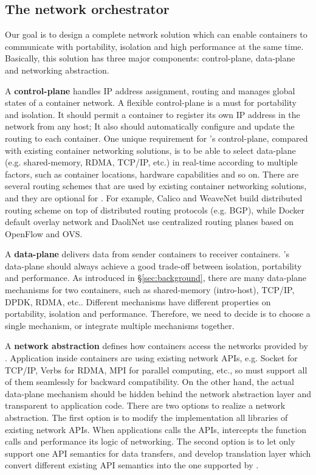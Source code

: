 \subsection{The network orchestrator}

\iffalse

Our goal is to design a complete network solution which can enable containers
to communicate with portability, isolation and high performance at the same time.
Basically, this solution has three major components: control-plane, data-plane 
and networking abstraction. 


A \textbf{control-plane} handles IP address assignment, routing and manages global states of a container network.
A flexible control-plane is a must for portability and isolation. 
It should permit a container to register its own IP address in the network
from any host; It also should automatically configure and update the routing 
to each container. One unique requirement for \sysname's control-plane,
compared with existing container networking solutions, is to be able to 
select data-plane (e.g. shared-memory, RDMA, TCP/IP, etc.) in real-time
according to multiple factors, such as container locations, hardware 
capabilities and so on. 
There are several routing schemes that are used by existing
container networking solutions, and they are optional for \sysname. 
For example, Calico and WeaveNet build distributed routing scheme on top of 
distributed routing protocols (e.g. BGP), while Docker default overlay network
and DaoliNet use centralized routing planes based on OpenFlow and OVS.

A \textbf{data-plane} delivers data from sender containers to receiver 
containers. \sysname's data-plane should always achieve a good trade-off
between isolation, portability and performance. 
As introduced in \S\ref{sec:background}, there are many data-plane mechanisms
for two containers, such as shared-memory (intro-host), TCP/IP, DPDK, RDMA, etc..
Different mechanisms have different properties on portability, isolation and 
performance. Therefore, we need to decide is to choose a single mechanism, or
integrate multiple mechanisms together.

A \textbf{network abstraction} defines how containers access the networks
provided by \sysname. Application inside containers are using existing 
network APIs, e.g. Socket for TCP/IP, Verbs for RDMA, MPI for parallel computing, etc., so \sysname must support all of them seamlessly for 
backward compatibility. On the other hand, the actual data-plane mechanism
should be hidden behind the network abstraction layer and transparent to 
application code. There are two options to realize a network abstraction.
The first option is to modify the implementation all libraries of existing
network APIs. When applications calls the APIs, \sysname intercepts
the function calls and performance its logic of networking. 
The second option is to let \sysname only support one API semantics for
data transfers, and develop translation layer which convert different
existing API semantics into the one supported by \sysname.

